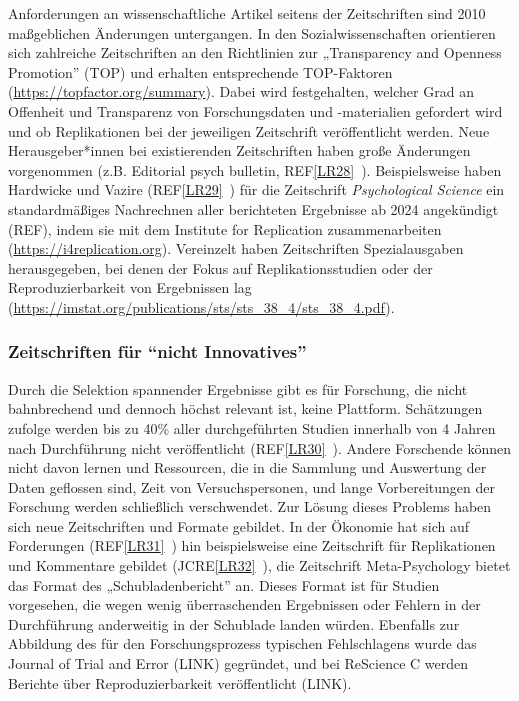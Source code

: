 \documentclass[
  letterpaper,
  DIV=11,
  numbers=noendperiod]{scrreprt}
\begin{document}
Anforderungen an wissenschaftliche Artikel seitens der Zeitschriften
sind 2010 maßgeblichen Änderungen untergangen. In den
Sozialwissenschaften orientieren sich zahlreiche Zeitschriften an den
Richtlinien zur „Transparency and Openness Promotion'' (TOP) und
erhalten entsprechende TOP-Faktoren
(\url{https://topfactor.org/summary}). Dabei wird festgehalten, welcher
Grad an Offenheit und Transparenz von Forschungsdaten und -materialien
gefordert wird und ob Replikationen bei der jeweiligen Zeitschrift
veröffentlicht werden. Neue Herausgeber*innen bei existierenden
Zeitschriften haben große Änderungen vorgenommen (z.B. Editorial psych
bulletin, REF\hyperref[_msocom_28]{{[}LR28{]}}~). Beispielsweise haben
Hardwicke und Vazire (REF\hyperref[_msocom_29]{{[}LR29{]}}~) für die
Zeitschrift \emph{Psychological Science} ein standardmäßiges Nachrechnen
aller berichteten Ergebnisse ab 2024 angekündigt (REF), indem sie mit
dem Institute for Replication zusammenarbeiten
(\url{https://i4replication.org}). Vereinzelt haben Zeitschriften
Spezialausgaben herausgegeben, bei denen der Fokus auf
Replikationsstudien oder der Reproduzierbarkeit von Ergebnissen lag
(\url{https://imstat.org/publications/sts/sts_38_4/sts_38_4.pdf}).

\subsubsection{Zeitschriften für ``nicht
Innovatives''}\label{zeitschriften-fuxfcr-nicht-innovatives}

Durch die Selektion spannender Ergebnisse gibt es für Forschung, die
nicht bahnbrechend und dennoch höchst relevant ist, keine Plattform.
Schätzungen zufolge werden bis zu 40\% aller durchgeführten Studien
innerhalb von 4 Jahren nach Durchführung nicht veröffentlicht
(REF\hyperref[_msocom_30]{{[}LR30{]}}~). Andere Forschende können nicht
davon lernen und Ressourcen, die in die Sammlung und Auswertung der
Daten geflossen sind, Zeit von Versuchspersonen, und lange
Vorbereitungen der Forschung werden schließlich verschwendet. Zur Lösung
dieses Problems haben sich neue Zeitschriften und Formate gebildet. In
der Ökonomie hat sich auf Forderungen
(REF\hyperref[_msocom_31]{{[}LR31{]}}~) hin beispielsweise eine
Zeitschrift für Replikationen und Kommentare gebildet
(JCRE\hyperref[_msocom_32]{{[}LR32{]}}~), die Zeitschrift
Meta-Psychology bietet das Format des „Schubladenbericht'' an. Dieses
Format ist für Studien vorgesehen, die wegen wenig überraschenden
Ergebnissen oder Fehlern in der Durchführung anderweitig in der
Schublade landen würden. Ebenfalls zur Abbildung des für den
Forschungsprozess typischen Fehlschlagens wurde das Journal of Trial and
Error (LINK) gegründet, und bei ReScience C werden Berichte über
Reproduzierbarkeit veröffentlicht (LINK).
\end{document}
